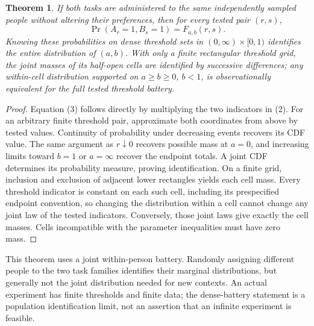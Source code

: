 \documentclass[11pt]{article}
\newtheorem{theorem}{Theorem}
\theoremstyle{definition}
\begin{document}
\begin{theorem}
If both tasks are administered to the same independently sampled people
without altering their preferences, then for every tested pair $(r,s)$,
\[
 \Pr(A_r=1,B_s=1)=F_{a,b}(r,s).                          \tag{3}
\]
Knowing these probabilities on dense threshold sets in
$(0,\infty)\times[0,1)$ identifies the entire distribution of $(a,b)$.
With only a finite rectangular threshold grid, the joint masses of its
half-open cells are identified by successive differences; any within-cell
distribution supported on $a\ge b\ge0$, $b<1$, is observationally
equivalent for the full tested threshold battery.
\end{theorem}
\begin{proof}
Equation (3) follows directly by multiplying the two indicators in (2).
For an arbitrary finite threshold pair, approximate both coordinates
from above by tested values. Continuity of probability under decreasing
events recovers its CDF value. The same argument as $r\downarrow0$
recovers possible mass at $a=0$, and increasing limits toward $b=1$
or $a=\infty$ recover the endpoint totals. A joint CDF determines its
probability measure, proving identification. On a finite grid, inclusion
and exclusion of adjacent lower rectangles yields each cell mass. Every
threshold indicator is constant on each such cell, including its
prespecified endpoint convention, so changing the distribution within
a cell cannot change any joint law of the tested indicators. Conversely,
those joint laws give exactly the cell masses. Cells incompatible with
the parameter inequalities must have zero mass.
\end{proof}
This theorem uses a joint within-person battery. Randomly assigning
different people to the two task families identifies their marginal
distributions, but generally not the joint distribution needed for new
contexts. An actual experiment has finite thresholds and finite data;
the dense-battery statement is a population identification limit, not
an assertion that an infinite experiment is feasible.
\end{document}
